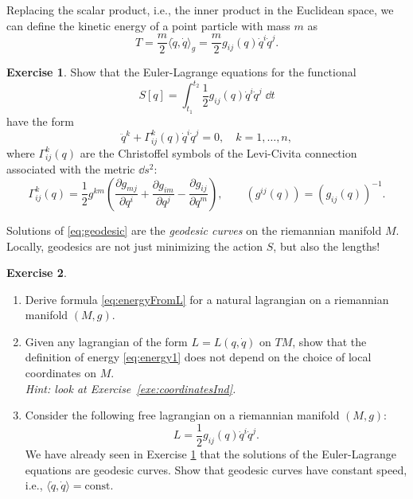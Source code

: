 \documentclass[english,fontsize=11pt,paper=b5]{scrbook}
\numberwithin{equation}{chapter}
\theoremstyle{definition}
\newtheorem{exercise}{Exercise}[chapter]
\begin{document}
    Replacing the scalar product, i.e., the inner product in the Euclidean space, we can define the kinetic energy of a point particle with mass $m$ as
    \begin{equation}
      T = \frac m2 \langle\dot q, \dot q\rangle_g = \frac{m}2 g_{ij}(q)\dot q^i\dot q^j.
    \end{equation}

    \begin{exercise}\label{exe:geodesic1}
      Show that the Euler-Lagrange equations for the functional
      \begin{equation}
        S[q] = \int_{t_1}^{t_2} \frac 12 g_{ij}(q) \dot q^i \dot q^j\; \dd t
      \end{equation}
      have the form
      \begin{equation}\label{eq:geodesic}
        \ddot q^k + \Gamma_{ij}^k(q) \dot q^i \dot q^j = 0, \quad k=1,\ldots, n,
      \end{equation}
      where $\Gamma_{ij}^k(q)$ are the Christoffel symbols of the Levi-Civita connection associated with the metric $\dd s^2$:
      \begin{equation}
        \Gamma_{ij}^k(q) = \frac12 g^{km}\left(
          \frac{\partial g_{mj}}{\partial q^i} + \frac{\partial g_{im}}{\partial q^j}-\frac{\partial g_{ij}}{\partial q^m}
        \right),
        \qquad (g^{ij}(q)) = (g_{ij}(q))^{-1}.
      \end{equation}
    \end{exercise}

    Solutions of \eqref{eq:geodesic} are the \emph{geodesic curves} on the riemannian manifold $M$. Locally, geodesics are not just minimizing the action $S$, but also the lengths!

    \begin{exercise}
      \begin{enumerate}
        \item Derive formula \eqref{eq:energyFromL} for a natural lagrangian on a riemannian manifold $(M,g)$.
        \item Given any lagrangian of the form $L = L(q, \dot q)$ on $TM$, show that the definition of energy \eqref{eq:energy1} does not depend on the choice of local coordinates on $M$.\\\textit{Hint: look at Exercise~\ref{exe:coordinatesInd}.}
        \item Consider the following free lagrangian on a riemannian manifold $(M, g)$:
          \begin{equation}
            L = \frac12 g_{ij}(q)\dot q^i \dot q^j.
          \end{equation}
          We have already seen in Exercise \ref{exe:geodesic1} that the solutions of the Euler-Lagrange equations are geodesic curves.
          Show that geodesic curves have constant speed, i.e., $\langle\dot q, \dot q\rangle = \mathrm{const}$.
      \end{enumerate}
    \end{exercise}
\end{document}
